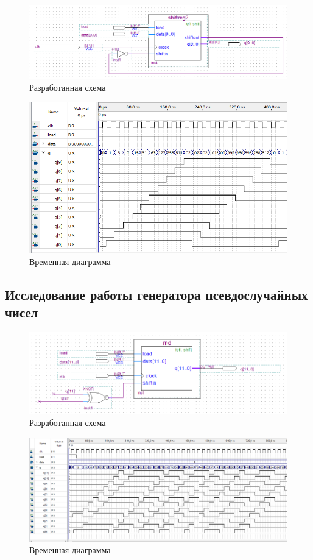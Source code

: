 \documentclass[a4paper,12pt]{article}
\begin{document}
    \begin{figure}[H]
        \centering
        \includegraphics[width=\linewidth]{scheme3}
        \caption{Разработанная схема}
    \end{figure}
    \begin{figure}[H]
        \centering
        \includegraphics[width=\linewidth]{wave3}
        \caption{Временная диаграмма}
    \end{figure}
    
    \subsection{Исследование работы генератора псевдослучайных чисел}
    
    \begin{figure}[H]
        \centering
        \includegraphics[width=\linewidth]{scheme4}
        \caption{Разработанная схема}
    \end{figure}
    \begin{figure}[H]
        \centering
        \includegraphics[width=\linewidth]{wave4}
        \caption{Временная диаграмма}
    \end{figure}
    
\end{document}
